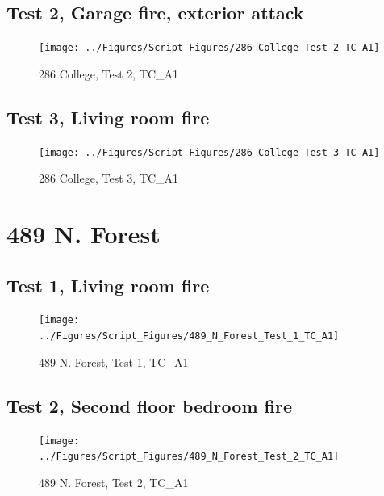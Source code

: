 \documentclass[12pt,oneside]{book}
\begin{document}
\clearpage


\subsection{Test 2, Garage fire, exterior attack}

\begin{figure}[!ht]
\texttt{[image: ../Figures/Script\_Figures/286\_College\_Test\_2\_TC\_A1]}
\caption{286 College, Test 2, TC\_A1}
\label{fig:286_College_Test_2_TC_A1}
\end{figure}


\clearpage


\subsection{Test 3, Living room fire}

\begin{figure}[!ht]
\texttt{[image: ../Figures/Script\_Figures/286\_College\_Test\_3\_TC\_A1]}
\caption{286 College, Test 3, TC\_A1}
\label{fig:286_College_Test_3_TC_A1}
\end{figure}


\clearpage


\section{489 N. Forest}

\subsection{Test 1, Living room fire}

\begin{figure}[!ht]
\texttt{[image: ../Figures/Script\_Figures/489\_N\_Forest\_Test\_1\_TC\_A1]}
\caption{489 N. Forest, Test 1, TC\_A1}
\label{fig:489_N_Forest_Test_1_TC_A1}
\end{figure}

\subsection{Test 2, Second floor bedroom fire}

\begin{figure}[!ht]
\texttt{[image: ../Figures/Script\_Figures/489\_N\_Forest\_Test\_2\_TC\_A1]}
\caption{489 N. Forest, Test 2, TC\_A1}
\label{fig:489_N_Forest_Test_2_TC_A1}
\end{figure}

\clearpage
\end{document}
